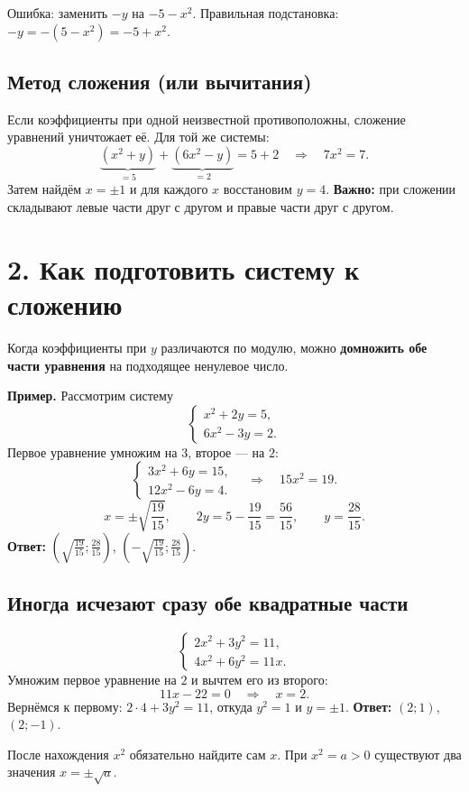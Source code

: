 \documentclass[a4paper,12pt]{article}
\newcommand{\key}[1]{{\color{darkaccent}\textbf{#1}}}
\newcommand{\note}[1]{{\small\color{quiet}#1}}
\newcommand{\headsec}[1]{\section*{\color{darkaccent}#1}\vspace{-6pt}{\color{hairline}\rule{\linewidth}{0.55pt}}\par\vspace{1pt}}
\newcommand{\headsub}[1]{\subsection*{\color{accent}#1}\vspace{-4pt}}
\begin{document}
\note{Ошибка: заменить \(-y\) на \(-5-x^2\). Правильная подстановка:
\(-y=-(5-x^2)=-5+x^2\).}

\headsub{Метод сложения (или вычитания)}
Если коэффициенты при одной неизвестной противоположны, сложение уравнений уничтожает её.
Для той же системы:
\[
\underbrace{(x^2+y)}_{=5}+\underbrace{(6x^2-y)}_{=2}=5+2
\quad\Longrightarrow\quad 7x^2=7.
\]
Затем найдём \(x=\pm1\) и для каждого \(x\) восстановим \(y=4\).
\key{Важно:} при сложении складывают левые части друг с другом и правые части друг с другом.

\headsec{2. Как подготовить систему к сложению}
Когда коэффициенты при \(y\) различаются по модулю, можно \key{домножить обе части уравнения} на подходящее ненулевое число.

\key{Пример.} Рассмотрим систему
\[
\begin{cases}
x^2+2y=5,\\6x^2-3y=2.
\end{cases}
\]
Первое уравнение умножим на \(3\), второе --- на \(2\):
\[
\begin{cases}
3x^2+6y=15,\\12x^2-6y=4.
\end{cases}
\quad\Longrightarrow\quad 15x^2=19.
\]
\[
x=\pm\sqrt{\frac{19}{15}},\qquad
2y=5-\frac{19}{15}=\frac{56}{15},\qquad y=\frac{28}{15}.
\]
\key{Ответ:} \(\left(\sqrt{\frac{19}{15}};\frac{28}{15}\right)\),
\(\left(-\sqrt{\frac{19}{15}};\frac{28}{15}\right)\).

\headsub{Иногда исчезают сразу обе квадратные части}
\[
\begin{cases}2x^2+3y^2=11,\\4x^2+6y^2=11x.\end{cases}
\]
Умножим первое уравнение на \(2\) и вычтем его из второго:
\[
11x-22=0\quad\Longrightarrow\quad x=2.
\]
Вернёмся к первому: \(2\cdot4+3y^2=11\), откуда \(y^2=1\) и \(y=\pm1\).
\key{Ответ:} \((2;1)\), \((2;-1)\).

\note{После нахождения \(x^2\) обязательно найдите сам \(x\). При \(x^2=a>0\) существуют два значения \(x=\pm\sqrt a\).}
\end{document}
